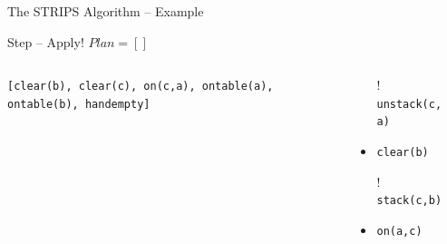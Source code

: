 \documentclass[presentation]{beamer}\mode<presentation>{\usetheme{AMSBolognaFC}}
\begin{document}
\begin{frame}[c]{The STRIPS Algorithm -- Example}
\small

    \begin{exampleblock}{Step \nextStripsExampleStep{}  -- Apply! \hfill $Plan = []$}
        \begin{columns}[t]
            \begin{column}{.30\linewidth}\centering
                \texttt{[clear(b), clear(c), on(c,a), ontable(a), ontable(b), handempty]}
            \end{column}
            \begin{column}{.50\linewidth}\centering
                \begin{itemize}
                    \item[!] \texttt{unstack(c, a)}
                    \item \texttt{clear(b)}
                    \item[!] \texttt{stack(c,b)}
                    \item \texttt{on(a,c)}
                \end{itemize}
            \end{column}
            \begin{column}{.10\linewidth}\centering
                
            \end{column}
        \end{columns}
    \end{exampleblock}

\end{frame}

\end{document}
